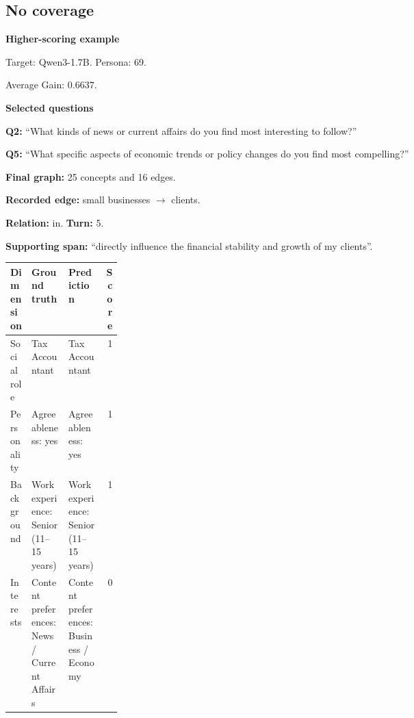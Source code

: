 \documentclass{ieeeaccess}
\begin{document}
\begin{multicols*}{2}
\subsection{No coverage}
\par\medskip\noindent\begin{minipage}{\linewidth}
\textbf{Higher-scoring example}\par
\noindent Target: Qwen3-1.7B. Persona: 69.\par
\noindent Average Gain: $0.6637$.\par\smallskip
\noindent\textbf{Selected questions}\par
\noindent\textbf{Q2:} ``What kinds of news or current affairs do you find most interesting to follow?''\par
\noindent\textbf{Q5:} ``What specific aspects of economic trends or policy changes do you find most compelling?''\par\smallskip
\noindent\textbf{Final graph:} 25 concepts and 16 edges.\par
\noindent\textbf{Recorded edge:} small businesses $\rightarrow$ clients.\par
\noindent\textbf{Relation:} in. \textbf{Turn:} 5.\par
\noindent\textbf{Supporting span:} ``directly influence the financial stability and growth of my clients''.\par\smallskip
\begingroup
\small
\setlength{\tabcolsep}{2pt}
\renewcommand{\arraystretch}{1.12}
\noindent\begin{tabularx}{\linewidth}{@{}p{0.19\linewidth}>{\raggedright\arraybackslash}X>{\raggedright\arraybackslash}Xr@{}}
\toprule
Dimension & Ground truth & Prediction & Score \\
\midrule
Social role & Tax Accountant & Tax Accountant & 1 \\
\addlinespace[2pt]
Personality & Agreeableness: yes & Agreeableness: yes & 1 \\
\addlinespace[2pt]
Background & Work experience: Senior (11--15 years) & Work experience: Senior (11--15 years) & 1 \\
\addlinespace[2pt]
Interests & Content preferences: News / Current Affairs & Content preferences: Business / Economy & 0 \\
\bottomrule
\end{tabularx}\par
\endgroup
\end{minipage}\par\medskip


\end{multicols*}
\end{document}
